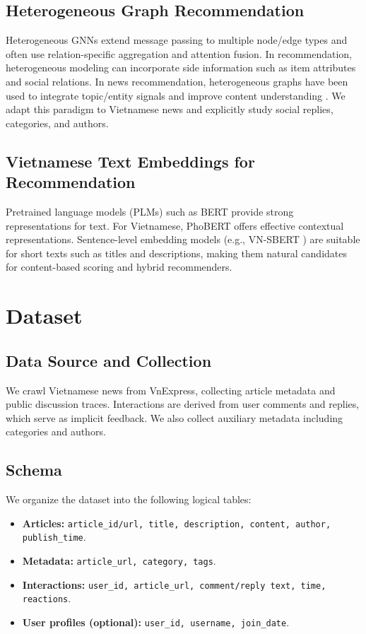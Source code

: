 \documentclass[11pt]{article}
\begin{document}
\subsection{Heterogeneous Graph Recommendation}
Heterogeneous GNNs extend message passing to multiple node/edge types and often use relation-specific aggregation and attention fusion. In recommendation, heterogeneous modeling can incorporate side information such as item attributes and social relations. In news recommendation, heterogeneous graphs have been used to integrate topic/entity signals and improve content understanding \citet{liu2021heterogeneous}. We adapt this paradigm to Vietnamese news and explicitly study social replies, categories, and authors.

\subsection{Vietnamese Text Embeddings for Recommendation}
Pretrained language models (PLMs) such as BERT \citet{devlin2018bert} provide strong representations for text. For Vietnamese, PhoBERT offers effective contextual representations. Sentence-level embedding models (e.g., VN-SBERT \citet{reimers2019sentence}) are suitable for short texts such as titles and descriptions, making them natural candidates for content-based scoring and hybrid recommenders.

\section{Dataset}
\subsection{Data Source and Collection}
We crawl Vietnamese news from VnExpress, collecting article metadata and public discussion traces. Interactions are derived from user comments and replies, which serve as implicit feedback. We also collect auxiliary metadata including categories and authors.

\subsection{Schema}
We organize the dataset into the following logical tables:
\begin{itemize}[leftmargin=*]
  \item \textbf{Articles:} \texttt{article\_id/url, title, description, content, author, publish\_time}.
  \item \textbf{Metadata:} \texttt{article\_url, category, tags}.
  \item \textbf{Interactions:} \texttt{user\_id, article\_url, comment/reply text, time, reactions}.
  \item \textbf{User profiles (optional):} \texttt{user\_id, username, join\_date}.
\end{itemize}
\end{document}
